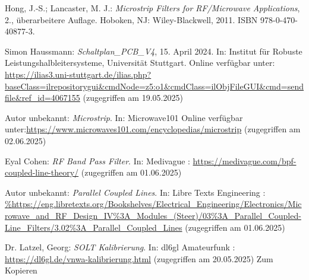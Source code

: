 
\begin{thebibliography}{1}
Hong, J.-S.; Lancaster, M. J.: \emph{Microstrip Filters for RF/Microwave Applications}, 2., überarbeitere Auflage. Hoboken, NJ: Wiley-Blackwell, 2011. ISBN 978-0-470-40877-3.

Simon Haussmann: \emph{Schaltplan\_PCB\_V4}, 15. April 2024. In: Institut für Robuste Leistungshalbleitersysteme, Universität Stuttgart. Online verfügbar unter: \url{https://ilias3.uni-stuttgart.de/ilias.php?baseClass=ilrepositorygui&cmdNode=z5:o1&cmdClass=ilObjFileGUI&cmd=sendfile&ref_id=4067155} (zugegriffen am 19.05.2025)


Autor unbekannt: \emph{Microstrip}. In: Microwave101 Online verfügbar unter:\url{https://www.microwaves101.com/encyclopedias/microstrip} (zugegriffen am 02.06.2025)


Eyal Cohen: \emph{RF Band Pass Filter}. In: Medivague : \url{https://medivague.com/bpf-coupled-line-theory/} (zugegriffen am 01.06.2025)

Autor unbekannt: \emph{Parallel Coupled Lines}. In: Libre Texts Engineering : \url{%https://eng.libretexts.org/Bookshelves/Electrical_Engineering/Electronics/Microwave_and_RF_Design_IV%3A_Modules_(Steer)/03%3A_Parallel_Coupled-Line_Filters/3.02%3A_Parallel_Coupled_Lines} (zugegriffen am 01.06.2025)


Dr.  Latzel, Georg: \emph{SOLT Kalibrierung}. In: dl6gl Amateurfunk : \url{https://dl6gl.de/vnwa-kalibrierung.html} (zugegriffen am 20.05.2025) Zum Kopieren
  





\end{thebibliography}

\clearpage
